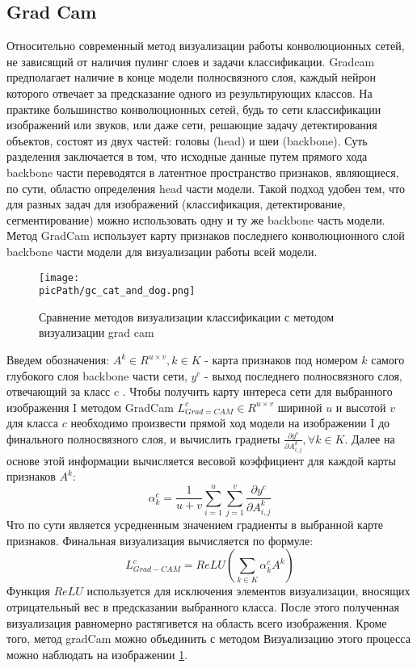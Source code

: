 \documentclass[oneside,final,14pt]{extreport}
\newcommand{\picPath}{img}
\begin{document}
\subsection{Grad Cam}
Относительно современный метод визуализации работы конволюционных сетей, не зависящий от наличия пулинг слоев и задачи классификации\cite{bib:gradcam}.  Gradcam предполагает наличие в конце модели полносвязного слоя, каждый нейрон которого отвечает за предсказание одного из результирующих классов.  На практике большинство конволюционных сетей, будь то сети классификации изображений или звуков, или даже сети, решающие задачу детектирования объектов, состоят из двух частей: головы (head) и шеи (backbone). Суть разделения заключается в том, что исходные данные путем прямого хода backbone части переводятся в латентное пространство признаков, являющиеся, по сути, областю определения head части модели. Такой подход удобен тем, что для разных задач для изображений (классификация, детектирование, сегментирование) можно использовать одну и ту же backbone часть модели. Метод GradCam использует карту признаков последнего конволюционного слой backbone части модели для визуализации работы всей модели. 
\begin{figure}[H]
\begin{center}
\texttt{[image: \\picPath/gc\_cat\_and\_dog.png]}
\end{center}
  \caption{Сравнение методов визуализации классификации с методом визуализации grad cam}
  \label{pic:gc_cat_and_dog}
\end{figure}
Введем обозначения: $A^k \in R^{u \times v}, k 
\in K$ - карта признаков под номером $k$ самого глубокого слоя backbone части сети, $y^c$ - выход последнего полносвязного слоя, отвечающий за класс $c$ . Чтобы получить карту интереса сети для выбранного изображения I методом GradCam $L_{Grad=CAM}^c \in R^{u \times v}$ шириной $u$ и высотой $v$ для класса $c$ необходимо произвести прямой ход модели на изображении I до финального полносвязного слоя, и вычислить градиеты $\frac{\partial y^c}{\partial A_{i,j}^k}, \forall k \in K$. Далее на основе этой информации вычисляется весовой коэффициент для каждой карты признаков $A^k$:
$$
\alpha_k^c  = \frac{1}{u+v}\sum_{i = 1}^u 
\sum_{j=1}^v \frac{\partial y^c}{\partial A_{i,j}^k}
$$
Что по сути является усредненным значением градиенты в выбранной карте признаков. Финальная визуализация вычисляется по формуле:
$$
L^c_{Grad-CAM} = ReLU(\sum_{k \in K} \alpha_k^c A^k)
$$
Функция $ReLU$ используется для исключения элементов визуализации, вносящих отрицательный вес в предсказании выбранного класса. После этого полученная визуализация равномерно растягивется на область всего изображения. Кроме того, метод gradCam можно объединить с  методом Визуализацию этого процесса можно наблюдать на изображении \ref{pic:gc_cat_and_dog}. 
\end{document}
